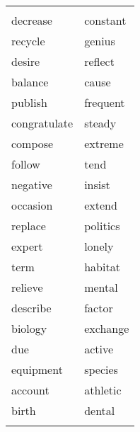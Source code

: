 \documentclass[9pt, a4paper, landscape, twocolumn]{oblivoir}
\begin{document}
    \begin{xtabular}{p|p}
        \hline \\
        decrease & constant \\
        recycle & genius \\
        desire & reflect \\
        balance & cause \\
        publish & frequent \\
        congratulate & steady \\
        compose & extreme \\
        follow & tend \\
        negative & insist \\
        occasion & extend \\
        replace & politics \\
        expert & lonely \\
        term & habitat \\
        relieve & mental \\
        describe & factor \\
        biology & exchange \\
        due & active \\
        equipment & species \\
        account & athletic \\
        birth & dental \\
        \hline \\
    \end{xtabular}

  

    
\end{document}
